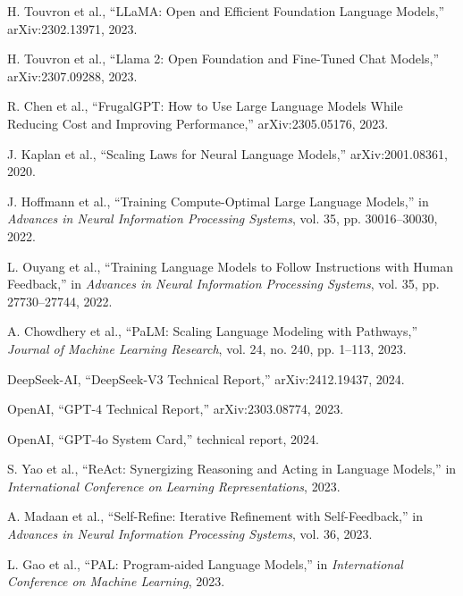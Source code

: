 \documentclass[12pt,a4paper,titlepage]{report}
\begin{document}
\begin{enumerate}[label={[\arabic*]}, leftmargin=*, itemsep=0.45em, align=left]
\item H. Touvron et al., ``LLaMA: Open and Efficient Foundation Language Models,'' arXiv:2302.13971, 2023.

\item H. Touvron et al., ``Llama 2: Open Foundation and Fine-Tuned Chat Models,'' arXiv:2307.09288, 2023.

\item R. Chen et al., ``FrugalGPT: How to Use Large Language Models While Reducing Cost and Improving Performance,'' arXiv:2305.05176, 2023.

\item J. Kaplan et al., ``Scaling Laws for Neural Language Models,'' arXiv:2001.08361, 2020.

\item J. Hoffmann et al., ``Training Compute-Optimal Large Language Models,'' in \textit{Advances in Neural Information Processing Systems}, vol. 35, pp. 30016--30030, 2022.

\item L. Ouyang et al., ``Training Language Models to Follow Instructions with Human Feedback,'' in \textit{Advances in Neural Information Processing Systems}, vol. 35, pp. 27730--27744, 2022.

\item A. Chowdhery et al., ``PaLM: Scaling Language Modeling with Pathways,'' \textit{Journal of Machine Learning Research}, vol. 24, no. 240, pp. 1--113, 2023.

\item DeepSeek-AI, ``DeepSeek-V3 Technical Report,'' arXiv:2412.19437, 2024.

\item OpenAI, ``GPT-4 Technical Report,'' arXiv:2303.08774, 2023.

\item OpenAI, ``GPT-4o System Card,'' technical report, 2024.

\item S. Yao et al., ``ReAct: Synergizing Reasoning and Acting in Language Models,'' in \textit{International Conference on Learning Representations}, 2023.

\item A. Madaan et al., ``Self-Refine: Iterative Refinement with Self-Feedback,'' in \textit{Advances in Neural Information Processing Systems}, vol. 36, 2023.

\item L. Gao et al., ``PAL: Program-aided Language Models,'' in \textit{International Conference on Machine Learning}, 2023.


\end{enumerate}
\end{document}
